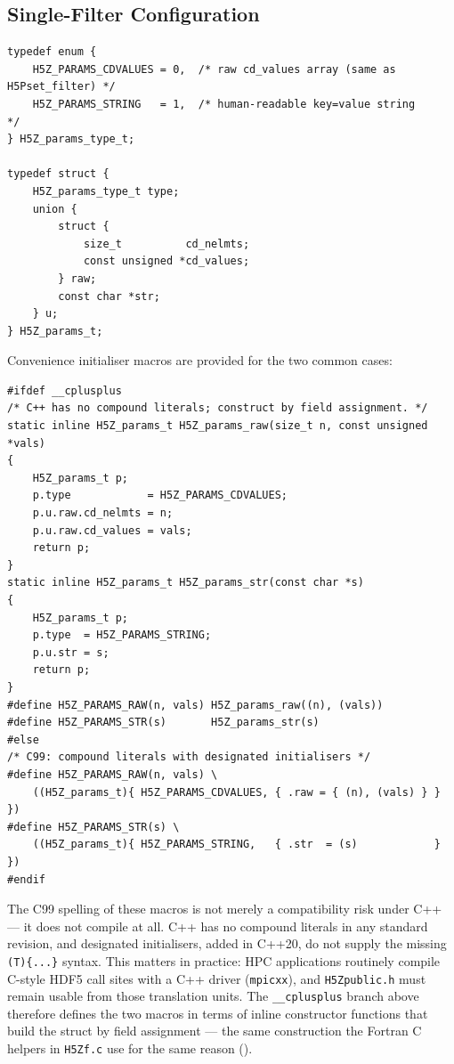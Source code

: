 \documentclass[../RFC-HDFG-2026-001.tex]{subfiles}
\begin{document}
\subsection{Single-Filter Configuration}
\label{sec:append-filter}


\begin{verbatim}
typedef enum {
    H5Z_PARAMS_CDVALUES = 0,  /* raw cd_values array (same as H5Pset_filter) */
    H5Z_PARAMS_STRING   = 1,  /* human-readable key=value string              */
} H5Z_params_type_t;

typedef struct {
    H5Z_params_type_t type;
    union {
        struct {
            size_t          cd_nelmts;
            const unsigned *cd_values;
        } raw;
        const char *str;
    } u;
} H5Z_params_t;
\end{verbatim}

Convenience initialiser macros are provided for the two common cases:

\begin{verbatim}
#ifdef __cplusplus
/* C++ has no compound literals; construct by field assignment. */
static inline H5Z_params_t H5Z_params_raw(size_t n, const unsigned *vals)
{
    H5Z_params_t p;
    p.type            = H5Z_PARAMS_CDVALUES;
    p.u.raw.cd_nelmts = n;
    p.u.raw.cd_values = vals;
    return p;
}
static inline H5Z_params_t H5Z_params_str(const char *s)
{
    H5Z_params_t p;
    p.type  = H5Z_PARAMS_STRING;
    p.u.str = s;
    return p;
}
#define H5Z_PARAMS_RAW(n, vals) H5Z_params_raw((n), (vals))
#define H5Z_PARAMS_STR(s)       H5Z_params_str(s)
#else
/* C99: compound literals with designated initialisers */
#define H5Z_PARAMS_RAW(n, vals) \
    ((H5Z_params_t){ H5Z_PARAMS_CDVALUES, { .raw = { (n), (vals) } } })
#define H5Z_PARAMS_STR(s) \
    ((H5Z_params_t){ H5Z_PARAMS_STRING,   { .str  = (s)            } })
#endif
\end{verbatim}

The C99 spelling of these macros is not merely a compatibility risk under
C++ --- it does not compile at all.  C++ has no compound literals in any
standard revision, and designated initialisers, added in C++20, do not
supply the missing \texttt{(T)\{...\}} syntax.  This matters in practice:
HPC applications routinely compile C-style HDF5 call sites with a C++
driver (\texttt{mpicxx}), and \texttt{H5Zpublic.h} must remain usable from
those translation units.  The \texttt{\_\_cplusplus} branch above therefore
defines the two macros in terms of inline constructor functions that build
the struct by field assignment --- the same construction the Fortran C
helpers in \texttt{H5Zf.c} use for the same reason
(\SectionRef{sec:fortran-bindings}).
\end{document}
